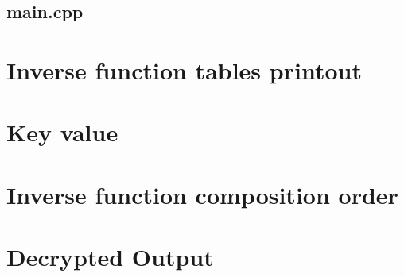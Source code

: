 \documentclass[12pt,titlepage]{article}
\begin{document}
\subsection*{main.cpp}


\section{Inverse function tables printout}
\section{Key value}
\section{Inverse function composition order}
\section{Decrypted Output}
\end{document}
